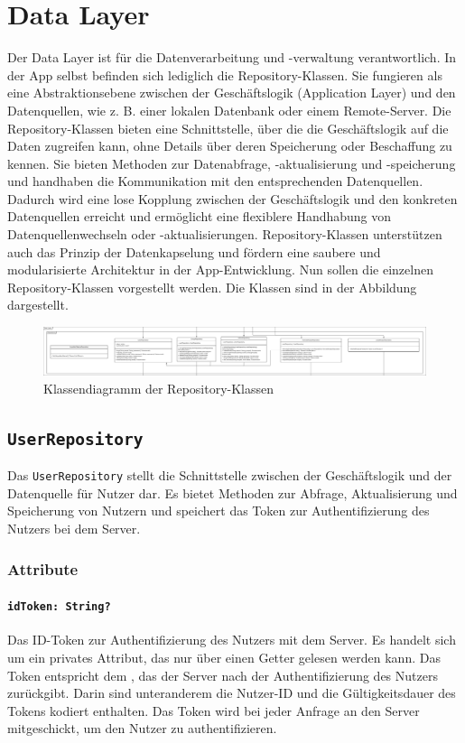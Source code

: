 \documentclass{entwurfsheft}
\begin{document}
\newpage
\section{Data Layer}
Der Data Layer ist für die Datenverarbeitung und -verwaltung verantwortlich. In der App selbst befinden sich lediglich die Repository-Klassen. Sie fungieren als eine Abstraktionsebene zwischen der Geschäftslogik (Application Layer) und den Datenquellen, wie z. B. einer lokalen Datenbank oder einem Remote-Server. Die Repository-Klassen bieten eine Schnittstelle, über die die Geschäftslogik auf die Daten zugreifen kann, ohne Details über deren Speicherung oder Beschaffung zu kennen. Sie bieten Methoden zur Datenabfrage, -aktualisierung und -speicherung und handhaben die Kommunikation mit den entsprechenden Datenquellen. Dadurch wird eine lose Kopplung zwischen der Geschäftslogik und den konkreten Datenquellen erreicht und ermöglicht eine flexiblere Handhabung von Datenquellenwechseln oder -aktualisierungen. Repository-Klassen unterstützen auch das Prinzip der Datenkapselung und fördern eine saubere und modularisierte Architektur in der App-Entwicklung.
Nun sollen die einzelnen Repository-Klassen vorgestellt werden. Die Klassen sind in der Abbildung dargestellt.
\begin{figure}[htp]
    \centering
    \includegraphics[width=\textwidth]{images/dataLayer/dataLayer.pdf}
    \caption{Klassendiagramm der Repository-Klassen}
    \label{fig:dataLayer}
\end{figure}
\newpage
\subsection{\texttt{UserRepository}}\label{sec:UserRepository}
Das \texttt{UserRepository} stellt die Schnittstelle zwischen der Geschäftslogik und der Datenquelle für Nutzer dar. Es bietet Methoden zur Abfrage, Aktualisierung und Speicherung von Nutzern und speichert das Token zur Authentifizierung des Nutzers bei dem Server.
\subsubsection*{Attribute}
\paragraph{\texttt{idToken: String?}}
Das ID-Token zur Authentifizierung des Nutzers mit dem Server. Es handelt sich um ein privates Attribut, das nur über einen Getter gelesen werden kann. Das Token entspricht dem , das der Server nach der Authentifizierung des Nutzers zurückgibt. Darin sind unteranderem die Nutzer-ID und die Gültigkeitsdauer des Tokens kodiert enthalten. Das Token wird bei jeder Anfrage an den Server mitgeschickt, um den Nutzer zu authentifizieren.
\end{document}
